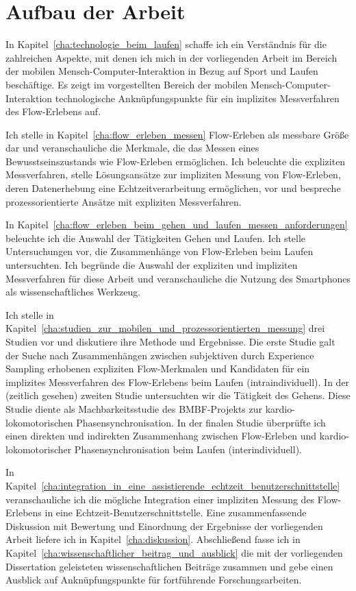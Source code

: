 

\section{Aufbau der Arbeit} 

\label{sec:aufbau_der_arbeit}

In Kapitel~\ref{cha:technologie_beim_laufen} schaffe ich ein Verständnis für die zahlreichen Aspekte, mit denen ich mich in der vorliegenden Arbeit im Bereich der mobilen Mensch-Computer-Interaktion in Bezug auf Sport und Laufen beschäftige. Es zeigt im vorgestellten Bereich der mobilen Mensch-Computer-Interaktion technologische Anknüpfungspunkte für ein implizites Messverfahren des Flow-Erlebens auf.

Ich stelle in Kapitel~\ref{cha:flow_erleben_messen} Flow-Erleben als messbare Größe dar und veranschauliche die Merkmale, die das Messen eines Bewusstseinszustands wie Flow-Erleben ermöglichen. Ich beleuchte die expliziten Messverfahren, stelle Lösungsansätze zur impliziten Messung von Flow-Erleben, deren Datenerhebung eine Echtzeitverarbeitung ermöglichen, vor und bespreche prozessorientierte Ansätze mit expliziten Messverfahren.

In Kapitel~\ref{cha:flow_erleben_beim_gehen_und_laufen_messen_anforderungen} beleuchte ich die Auswahl der Tätigkeiten Gehen und Laufen. Ich stelle Untersuchungen vor, die Zusammenhänge von Flow-Erleben beim Laufen untersuchten. Ich begründe die Auswahl der expliziten und impliziten Messverfahren für diese Arbeit und veranschauliche die Nutzung des Smartphones als wissenschaftliches Werkzeug.

Ich stelle in Kapitel~\ref{cha:studien_zur_mobilen_und_prozessorientierten_messung} drei Studien vor und diskutiere ihre Methode und Ergebnisse. Die erste Studie galt der Suche nach Zusammenhängen zwischen subjektiven durch Experience Sampling erhobenen expliziten Flow-Merkmalen und Kandidaten für ein implizites Messverfahren des Flow-Erlebens beim Laufen (intraindividuell). In der (zeitlich gesehen) zweiten Studie untersuchten wir die Tätigkeit des Gehens. Diese Studie diente als Machbarkeitsstudie des \acs{BMBF}-Projekts zur kardio-lokomotorischen Phasensynchronisation. In der finalen Studie überprüfte ich einen direkten und indirekten Zusammenhang zwischen Flow-Erleben und kardio-lokomotorischer Phasensynchronisation beim Laufen (interindividuell).

In Kapitel~\ref{cha:integration_in_eine_assistierende_echtzeit_benutzerschnittstelle} veranschauliche ich die mögliche Integration einer impliziten Messung des Flow-Erlebens in eine Echtzeit-Benutzerschnittstelle. Eine zusammenfassende Diskussion mit Bewertung und Einordnung der Ergebnisse der vorliegenden Arbeit liefere ich in Kapitel~\ref{cha:diskussion}. Abschließend fasse ich in Kapitel~\ref{cha:wissenschaftlicher_beitrag_und_ausblick} die mit der vorliegenden Dissertation geleisteten wissenschaftlichen Beiträge zusammen und gebe einen Ausblick auf Anknüpfungspunkte für fortführende Forschungsarbeiten.

